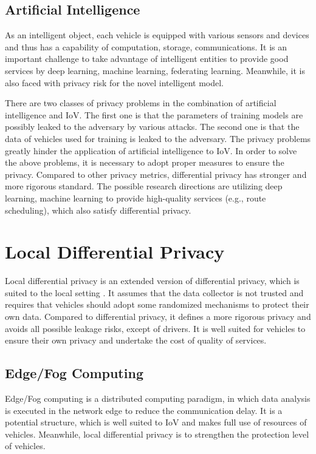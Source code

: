 \documentclass[journal,transmag,11pt]{IEEEtran}
\begin{document}
\subsection{Artificial Intelligence}

As an intelligent object, each vehicle is equipped with various sensors and devices and thus has a capability of computation, storage, communications. It is an important challenge to take advantage of intelligent entities to provide good services by deep learning, machine learning, federating learning. Meanwhile, it is also faced with privacy risk for the novel intelligent model.

There are two classes of privacy problems in the combination of artificial intelligence and IoV. The first one is that the parameters of training models are possibly leaked to the adversary by various attacks. The second one is that the data of vehicles used for training is leaked to the adversary. The privacy problems greatly hinder the application of artificial intelligence to IoV. In order to solve the above problems, it is necessary to adopt proper measures to ensure the privacy. Compared to other privacy metrics, differential privacy has stronger and more rigorous standard. The possible research directions are utilizing deep learning, machine learning to provide high-quality services (e.g., route scheduling), which also satisfy differential privacy.

\section{Local Differential Privacy}

Local differential privacy is an extended version of differential privacy, which is suited to the local setting \cite{conf/focs/DuchiJW13}. It assumes that the data collector is not trusted and requires that vehicles should adopt some randomized mechanisms to protect their own data. Compared to differential privacy, it defines a more rigorous privacy and avoids all possible leakage risks, except of drivers. It is well suited for vehicles to ensure their own privacy and undertake the cost of quality of services.

\subsection{Edge/Fog Computing}

Edge/Fog computing is a distributed computing paradigm, in which data analysis is executed in the network edge to reduce the communication delay. It is a potential structure, which is well suited to IoV and makes full use of resources of vehicles. Meanwhile, local differential privacy is to strengthen the protection level of vehicles. 
\end{document}
